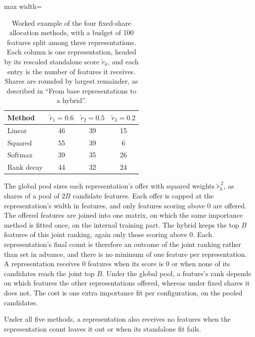 \begin{table}[htbp]
\centering
\begin{adjustbox}{max width=\textwidth}
\begin{tabular}{@{}lccc@{}}
\toprule
Method & $\tilde r_1 = 0.6$ & $\tilde r_2 = 0.5$ & $\tilde r_3 = 0.2$ \\
\midrule
Linear & 46 & 39 & 15 \\
Squared & 55 & 39 & 6 \\
Softmax & 39 & 35 & 26 \\
Rank decay & 44 & 32 & 24 \\
\bottomrule
\end{tabular}
\end{adjustbox}
\caption[Worked example of the four fixed-share allocation methods.]{Worked example of the four fixed-share allocation methods, with a budget of 100 features split among three representations. Each column is one representation, headed by its rescaled standalone score $\tilde r_k$, and each entry is the number of features it receives. Shares are rounded by largest remainder, as described in ``From base representations to a hybrid''.}
\label{tab:alloc_example}
\end{table}

The global pool sizes each representation's offer with squared weights $\tilde r_k^{\,2}$, as shares of a pool of $2B$ candidate features. Each offer is capped at the representation's width in features, and only features scoring above 0 are offered. The offered features are joined into one matrix, on which the same importance method is fitted once, on the internal training part. The hybrid keeps the top $B$ features of this joint ranking, again only those scoring above 0. Each representation's final count is therefore an outcome of the joint ranking rather than set in advance, and there is no minimum of one feature per representation. A representation receives 0 features when its score is 0 or when none of its candidates reach the joint top $B$. Under the global pool, a feature's rank depends on which features the other representations offered, whereas under fixed shares it does not. The cost is one extra importance fit per configuration, on the pooled candidates.

Under all five methods, a representation also receives no features when the representation count leaves it out or when its standalone fit fails.


